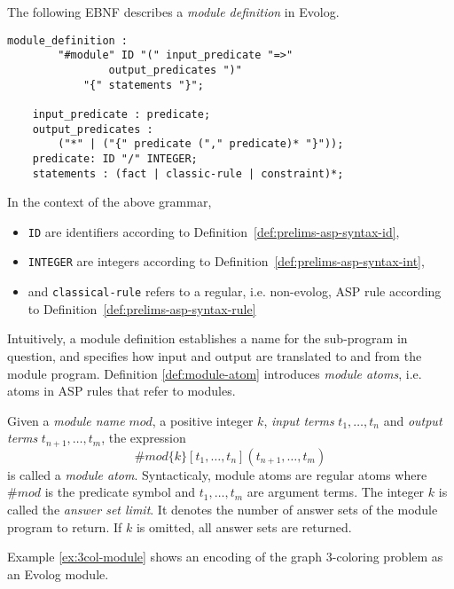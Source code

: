 \begin{definition}
\label{def:module-definition}
The following EBNF describes a \emph{module definition} in Evolog.
\begin{lstlisting}[style=code, label={lst:module-def-grammar}]
	module_definition : 
		"#module" ID "(" input_predicate "=>" 
				output_predicates ")" 
			"{" statements "}";
		
	input_predicate : predicate;
	output_predicates : 
		("*" | ("{" predicate ("," predicate)* "}"));
	predicate: ID "/" INTEGER;
	statements : (fact | classic-rule | constraint)*;
\end{lstlisting} 
In the context of the above grammar,
\begin{itemize}
	\item \texttt{ID} are identifiers according to Definition~\ref{def:prelims-asp-syntax-id},
	\item \texttt{INTEGER} are integers according to Definition~\ref{def:prelims-asp-syntax-int},
	\item and \texttt{classical-rule} refers to a regular, i.e. non-evolog, ASP rule according to Definition~\ref{def:prelims-asp-syntax-rule}
\end{itemize}
\end{definition}

Intuitively, a module definition establishes a name for the sub-program in question, and specifies how input and output are translated to and from the module program. Definition \ref{def:module-atom} introduces \emph{module atoms}, i.e. atoms in ASP rules that refer to modules.

\begin{definition}
\label{def:module-atom}
Given a \emph{module name} $\mathit{mod}$, a positive integer $k$, \emph{input terms} $t_1,\ldots,t_n$ and \emph{output terms} $t_{n+1},\ldots,t_m$, the expression
\[
	\#\mathit{mod}\{k\}[t_1,\ldots,t_n](t_{n+1},\ldots,t_m)
\]
is called a \emph{module atom}. Syntacticaly, module atoms are regular atoms where $\#\mathit{mod}$ is the predicate symbol and $t_1,\ldots,t_m$ are argument terms. The integer $k$ is called the \emph{answer set limit}. It denotes the number of answer sets of the module program to return. If $k$ is omitted, all answer sets are returned.
\end{definition}

Example \ref{ex:3col-module} shows an encoding of the graph 3-coloring problem as an Evolog module.


